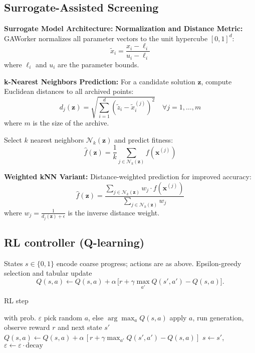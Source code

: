 \documentclass[12pt,a4paper]{article}
\begin{document}
\subsection{Surrogate-Assisted Screening}
\textbf{Surrogate Model Architecture:}
\textbf{Normalization and Distance Metric:}
GAWorker normalizes all parameter vectors to the unit hypercube $[0,1]^d$:
\begin{equation}
\tilde{x}_i = \frac{x_i - \ell_i}{u_i - \ell_i} \label{eq:surrogate_normalization}
\end{equation}
where $\ell_i$ and $u_i$ are the parameter bounds.

\textbf{k-Nearest Neighbors Prediction:}
For a candidate solution $\bm{z}$, compute Euclidean distances to all archived points:
\begin{equation}
d_j(\bm{z}) = \sqrt{\sum_{i=1}^d (\tilde{z}_i - \tilde{x}_i^{(j)})^2} \quad \forall j = 1, \dots, m \label{eq:surrogate_distance}
\end{equation}
where $m$ is the size of the archive.

Select $k$ nearest neighbors $\mathcal{N}_k(\bm{z})$ and predict fitness:
\begin{equation}
\hat{f}(\bm{z}) = \frac{1}{k} \sum_{j \in \mathcal{N}_k(\bm{z})} f(\bm{x}^{(j)}) \label{eq:surrogate_prediction}
\end{equation}

\textbf{Weighted kNN Variant:}
Distance-weighted prediction for improved accuracy:
\begin{equation}
\hat{f}(\bm{z}) = \frac{\sum_{j \in \mathcal{N}_k(\bm{z})} w_j \cdot f(\bm{x}^{(j)})}{\sum_{j \in \mathcal{N}_k(\bm{z})} w_j} \label{eq:weighted_surrogate}
\end{equation}
where $w_j = \frac{1}{d_j(\bm{z}) + \epsilon}$ is the inverse distance weight.

\subsection{RL controller (Q-learning)}
States $s\in\{0,1\}$ encode coarse progress; actions are as above. Epsilon-greedy selection and tabular update
\[ Q(s,a) \leftarrow Q(s,a) + \alpha\,\big[ r + \gamma \max_{a'} Q(s',a') - Q(s,a)\big]. \]
\begin{algorithm}[H]
\caption{RL step}
\begin{algorithmic}[1]
\State with prob. $\varepsilon$ pick random $a$, else $\arg\max_a Q(s,a)$
\State apply $a$, run generation, observe reward $r$ and next state $s'$
\State $Q(s,a)\leftarrow Q(s,a)+\alpha\,[r+\gamma\max_{a'}Q(s',a')-Q(s,a)]$
\State $s\leftarrow s'$, $\varepsilon\leftarrow \varepsilon\cdot\text{decay}$
\end{algorithmic}
\end{algorithm}
\end{document}
